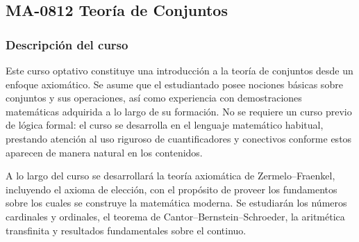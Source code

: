 \newpage
\subsection*{MA-0812 Teoría de Conjuntos}

\hypertarget{MA0812}{}
\begin{refsection}
\begin{table}[H]
\end{table}

\subsubsection*{Descripción del curso}

Este curso optativo constituye una introducción a la teoría de conjuntos desde un enfoque axiomático. Se asume que el estudiantado posee nociones básicas sobre conjuntos y sus operaciones, así como experiencia con demostraciones matemáticas adquirida a lo largo de su formación. No se requiere un curso previo de lógica formal: el curso se desarrolla en el lenguaje matemático habitual, prestando atención al uso riguroso de cuantificadores y conectivos conforme estos aparecen de manera natural en los contenidos.

A lo largo del curso se desarrollará la teoría axiomática de Zermelo--Fraenkel, incluyendo el axioma de elección, con el propósito de proveer los fundamentos sobre los cuales se construye la matemática moderna. Se estudiarán los números cardinales y ordinales, el teorema de Cantor--Bernstein--Schroeder, la aritmética transfinita y resultados fundamentales sobre el continuo.


\end{refsection}
